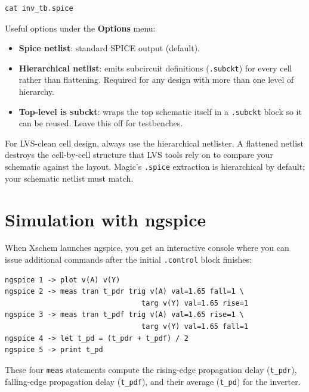 \documentclass[11pt]{article}
\begin{document}
\begin{lstlisting}
cat inv_tb.spice
\end{lstlisting}

Useful options under the \textbf{Options} menu:

\begin{itemize}[leftmargin=2em]
  \item \textbf{Spice netlist}: standard SPICE output (default).
  \item \textbf{Hierarchical netlist}: emits subcircuit definitions
        (\texttt{.subckt}) for every cell rather than flattening.
        Required for any design with more than one level of hierarchy.
  \item \textbf{Top-level is subckt}: wraps the top schematic itself
        in a \texttt{.subckt} block so it can be reused.
        Leave this off for testbenches.
\end{itemize}

\begin{warnbox}
For LVS-clean cell design, always use the hierarchical netlister.
A flattened netlist destroys the cell-by-cell structure that LVS tools
rely on to compare your schematic against the layout.
Magic's \texttt{.spice} extraction is hierarchical by default; your
schematic netlist must match.
\end{warnbox}

\section{Simulation with ngspice}

When Xschem launches ngspice, you get an interactive console where you
can issue additional commands after the initial \texttt{.control} block
finishes:

\begin{lstlisting}
ngspice 1 -> plot v(A) v(Y)
ngspice 2 -> meas tran t_pdr trig v(A) val=1.65 fall=1 \
                                targ v(Y) val=1.65 rise=1
ngspice 3 -> meas tran t_pdf trig v(A) val=1.65 rise=1 \
                                targ v(Y) val=1.65 fall=1
ngspice 4 -> let t_pd = (t_pdr + t_pdf) / 2
ngspice 5 -> print t_pd
\end{lstlisting}

These four \texttt{meas} statements compute the rising-edge propagation
delay (\texttt{t\_pdr}), falling-edge propagation delay
(\texttt{t\_pdf}), and their average (\texttt{t\_pd}) for the inverter.
\end{document}
